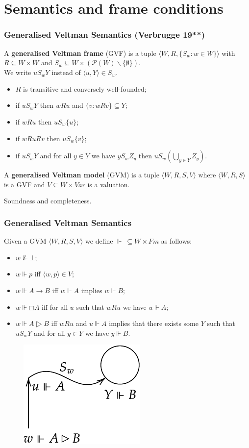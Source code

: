 \documentclass[xcolor={x11names}]{beamer}
\begin{document}
\section{Semantics and frame conditions}
\begin{frame}
  \frametitle{Generalised Veltman Semantics (Verbrugge 19**)}
  A \textbf{generalised Veltman frame} (GVF) is a tuple $⟨W,R,\{S_w:w∈W\}⟩$ with
  $R⊆W×W$ and $S_w⊆W×(𝒫(W)∖\{∅\})$.\\ We write $uS_wY$ instead of $⟨u,Y⟩∈S_w$.
  \begin{itemize}
    \item $R$ is transitive and conversely well-founded;
    \item if $uS_wY$ then $wRu$ and $\{v:wRv\}⊆Y$;
    \item if $wRu$ then $uS_w\{u\}$;
    \item if $wRuRv$ then $uS_w\{v\}$;
    \item if $uS_wY$ and for all $y∈Y$ we have $yS_wZ_y$ then $uS_w\left(⋃_{y∈Y}Z_y\right)$.
  \end{itemize}

  \pause
  \vspace{0.3cm}
  A \textbf{generalised Veltman model} (GVM) is a tuple $⟨W,R,S,V⟩$ where
  $⟨W,R,S⟩$ is a GVF and $V⊆W×Var$ is a valuation.

  Soundness and completeness.
\end{frame}

\begin{frame}
  \frametitle{Generalised Veltman Semantics}
  Given a GVM $⟨W,R,S,V⟩$ we define $⊩\ ⊆W×Fm$ as follows:
  \begin{itemize}
    \item $w⊮⊥$;
    \item $w⊩p$ iff $⟨w,p⟩∈V$;
    \item $w⊩A→B$ iff $w⊩A$ implies $w⊩B$;
    \item $w⊩□A$ iff for all $u$ such that $wRu$ we have $u⊩A$;
      \pause
    \item $w⊩A▷B$ iff $wRu$ and $u⊩A$ implies that there exists some $Y$ such
      that $uS_wY$ and for all $y∈Y$ we have $y⊩B$.
  \end{itemize}
  \begin{figure}[t]
    \includegraphics[scale=0.8]{img/a-rhd-b}
    \centering
  \end{figure}
\end{frame}
\end{document}
